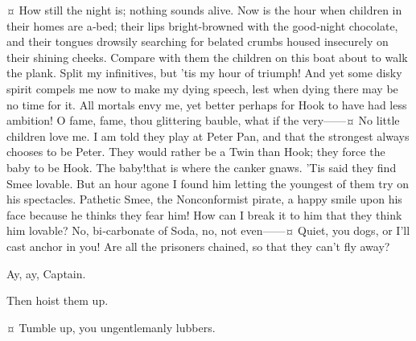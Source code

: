 \begin{drama}

\hookspeaks {}¤
How still the night is; nothing sounds alive.
Now is the hour when children in their homes are a‐bed;
their lips bright‐browned with the good‐night chocolate,
and their tongues drowsily searching for belated crumbs housed insecurely on their shining cheeks.
Compare with them the children on this boat about to walk the plank.
Split my infinitives, but ’tis my hour of triumph!
And yet some disky spirit compels me now to make my dying speech, lest when dying there may be no time for it.
All mortals envy me, yet better perhaps for Hook to have had less ambition!
O fame, fame, thou glittering bauble, what if the very——¤
No little children love me.
I am told they play at Peter Pan, and that the strongest always chooses to be Peter.
They would rather be a Twin than Hook; they force the baby to be Hook.
The baby!\@ that is where the canker gnaws.
’Tis said they find Smee lovable.
But an hour agone I found him letting the youngest of them try on his spectacles.
Pathetic Smee, the Nonconformist pirate, a happy smile upon his face because he thinks they fear him!
How can I break it to him that they think him lovable?
No, bi‐carbonate of Soda, no, not even——¤
Quiet, you dogs, or I’ll cast anchor in you!
Are all the prisoners chained, so that they can’t fly away?

\jukesspeaks
Ay, ay, Captain.

\hookspeaks
Then hoist them up.

\starkeyspeaks {}¤
Tumble up, you ungentlemanly lubbers.



\end{drama}
